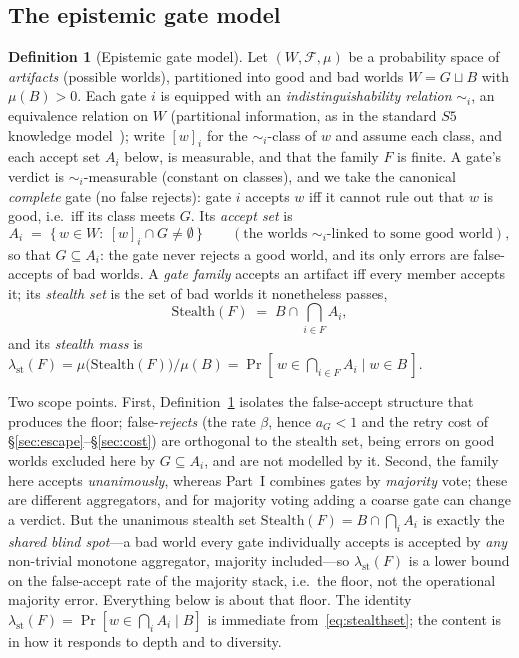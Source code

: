 \documentclass[11pt]{article}
\theoremstyle{definition}
\newtheorem{definition}{Definition}
\theoremstyle{remark}
\newcommand{\lst}{\lambda_{\mathrm{st}}}
\newcommand{\Stealth}{\mathrm{Stealth}}
\begin{document}
\subsection{The epistemic gate model}
\begin{definition}[Epistemic gate model]\label{def:epistemic}
Let $(W,\mathcal{F},\mu)$ be a probability space of \emph{artifacts} (possible worlds), partitioned
into good and bad worlds $W=G\sqcup B$ with $\mu(B)>0$. Each gate $i$ is equipped with an
\emph{indistinguishability relation} $\sim_i$, an equivalence relation on $W$ (partitional
information, as in the standard $S5$ knowledge model~\cite{fagin1995}); write $[w]_i$ for the
$\sim_i$-class of $w$ and assume each class, and each accept set $A_i$ below, is measurable, and that
the family $F$ is finite. A gate's verdict is $\sim_i$-measurable (constant on classes), and we take the
canonical \emph{complete} gate (no false rejects): gate $i$ accepts $w$ iff it cannot rule out that $w$
is good, i.e.\ iff its class meets $G$. Its \emph{accept set} is
\begin{equation}\label{eq:acceptset}
A_i\;=\;\{\,w\in W:\ [w]_i\cap G\neq\emptyset\,\}\qquad(\text{the worlds $\sim_i$-linked to some good world}),
\end{equation}
so that $G\subseteq A_i$: the gate never rejects a good world, and its only errors are
false-accepts of bad worlds. A \emph{gate family} accepts an artifact iff every member accepts it;
its \emph{stealth set} is the set of bad worlds it nonetheless passes,
\begin{equation}\label{eq:stealthset}
\Stealth(F)\;=\;B\cap\bigcap_{i\in F}A_i,
\end{equation}
and its \emph{stealth mass} is $\lst(F)=\mu\!\big(\Stealth(F)\big)/\mu(B)=\Pr[\,w\in\bigcap_{i\in F}A_i\mid w\in B\,]$.
\end{definition}

Two scope points. First, Definition~\ref{def:epistemic} isolates the false-accept structure that
produces the floor; false-\emph{rejects} (the rate $\beta$, hence $a_G<1$ and the retry cost of
\S\ref{sec:escape}--\S\ref{sec:cost}) are orthogonal to the stealth set, being errors on good worlds
excluded here by $G\subseteq A_i$, and are not modelled by it. Second, the family here accepts
\emph{unanimously}, whereas Part~I combines gates by \emph{majority} vote; these are different
aggregators, and for majority voting adding a coarse gate can change a verdict. But the unanimous
stealth set $\Stealth(F)=B\cap\bigcap_i A_i$ is exactly the \emph{shared blind spot}---a bad world every
gate individually accepts is accepted by \emph{any} non-trivial monotone aggregator, majority included---so
$\lst(F)$ is a lower bound on the false-accept rate of the majority stack, i.e.\ the floor, not the
operational majority error. Everything below is about that floor. The identity
$\lst(F)=\Pr[w\in\bigcap_i A_i\mid B]$ is immediate from~\eqref{eq:stealthset}; the content is in how it
responds to depth and to diversity.
\end{document}
